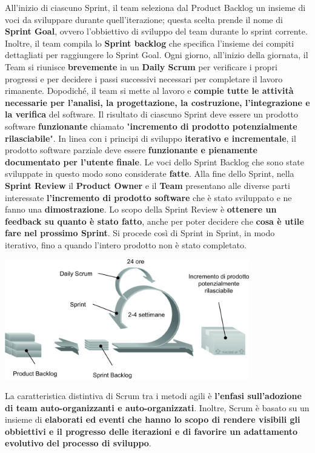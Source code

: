 \documentclass[12pt]{article}
\begin{document}
All'inizio di ciascuno Sprint, il team seleziona dal Product Backlog un insieme di voci da sviluppare durante quell'iterazione; questa scelta prende il nome di \textbf{Sprint Goal}, ovvero l'obbiettivo di sviluppo del team durante lo sprint corrente.
Inoltre, il team compila lo \textbf{Sprint backlog} che specifica l'insieme dei compiti dettagliati per raggiungere lo Sprint Goal.
Ogni giorno, all'inizio della giornata, il Team si riunisce \textbf{brevemente} in un \textbf{Daily Scrum} per verificare i propri progressi e per decidere i passi successivi necessari per completare il lavoro rimanente.
Dopodiché, il team si mette al lavoro e \textbf{compie tutte le attività necessarie per l'analisi, la progettazione, la costruzione, l'integrazione e la verifica} del software.
Il risultato di ciascuno Sprint deve essere un prodotto software \textbf{funzionante} chiamato "\textbf{incremento di prodotto potenzialmente rilasciabile}". 
In linea con i principi di sviluppo \textbf{iterativo e incrementale}, il prodotto software parziale deve essere \textbf{funzionante e pienamente documentato per l'utente finale}.
Le voci dello Sprint Backlog che sono state sviluppate in questo modo sono considerate \textbf{fatte}.
Alla fine dello Sprint, nella \textbf{Sprint Review} il \textbf{Product Owner} e il \textbf{Team} presentano alle diverse parti interessate \textbf{l'incremento di prodotto software} che è stato sviluppato e ne fanno una \textbf{dimostrazione}. 
Lo scopo della Sprint Review è \textbf{ottenere un feedback su quanto è stato fatto}, anche per poter decidere che \textbf{cosa è utile fare nel prossimo Sprint}.
Si procede così di Sprint in Sprint, in modo iterativo, fino a quando l'intero prodotto non è stato completato.
\begin{center}
    \includegraphics[width = 0.80\textwidth]{Images/23.png}
\end{center}
La caratteristica distintiva di Scrum tra i metodi agili è \textbf{l'enfasi sull'adozione di team auto-organizzanti e auto-organizzati}.
Inoltre, Scrum è basato su un insieme di \textbf{elaborati ed eventi che hanno lo scopo di rendere visibili gli obbiettivi e il progresso delle iterazioni e di favorire un adattamento evolutivo del processo di sviluppo}.
\end{document}
